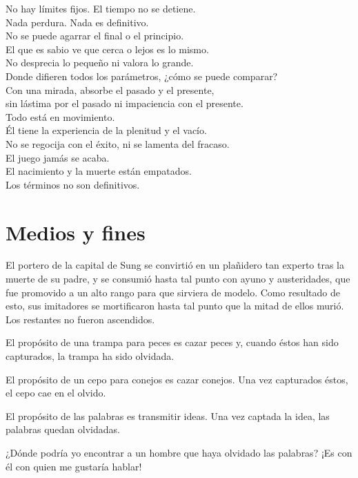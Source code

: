 \documentclass[book,b5paper,hidelinks,final]{memoir}
\begin{document}
	No hay límites fijos. El tiempo no se detiene.\\
	Nada perdura. Nada es definitivo.\\
	No se puede agarrar el final o el principio.\\
	El que es sabio ve que cerca o lejos es lo mismo.\\
	No desprecia lo pequeño ni valora lo grande.\\
	Donde difieren todos los parámetros, ¿cómo se puede comparar?\\
	Con una mirada, absorbe el pasado y el presente,\\
	sin lástima por el pasado ni impaciencia con el presente.\\
	Todo está en movimiento.\\
	Él tiene la experiencia de la plenitud y el vacío.\\
	No se regocija con el éxito, ni se lamenta del fracaso.\\
	El juego jamás se acaba.\\
	El nacimiento y la muerte están empatados.\\
	Los términos no son definitivos.
	
	\chapter*{Medios y fines}
	
	El portero de la capital de Sung se convirtió en un plañidero tan
	experto tras la muerte de su padre, y se consumió hasta tal punto con
	ayuno y austeridades, que fue promovido a un alto rango para que
	sirviera de modelo. Como resultado de esto, sus imitadores se
	mortificaron hasta tal punto que la mitad de ellos murió. Los restantes
	no fueron ascendidos.
	
	El propósito de una trampa para peces es cazar peces y, cuando éstos han
	sido capturados, la trampa ha sido olvidada.
	
	El propósito de un cepo para conejos es cazar conejos. Una vez
	capturados éstos, el cepo cae en el olvido.
	
	El propósito de las palabras es transmitir ideas. Una vez captada la
	idea, las palabras quedan olvidadas.
	
	¿Dónde podría yo encontrar a un hombre que haya olvidado las palabras?
	¡Es con él con quien me gustaría hablar!
	
	\chapter*{}
	
\end{document}
